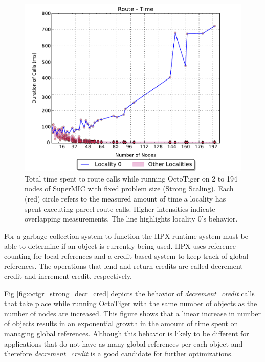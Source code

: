 \begin{figure}[t]
    \centering
    \includegraphics[width=.54\textwidth,height=\textheight,keepaspectratio]{graphs/octotiger_route_time}
    \caption{Total time spent to route calls while running OctoTiger on 2 to 194 nodes of SuperMIC with fixed problem size (Strong Scaling). Each (red) circle refers to the measured amount of time a locality has spent executing parcel route calls. Higher intensities indicate overlapping measurements. The line highlights locality 0's behavior.}
    \label{fig:octgr_strong_route_time}
\end{figure}

For a garbage collection system to function the HPX runtime system must be able
to determine if an object is currently being used. HPX uses reference counting
for local references and a credit-based system to keep track of global
references. The operations that lend and return credits are called decrement
credit and increment credit, respectively.

Fig \ref{fig:octgr_strong_decr_cred} depicts the behavior of \textit{decrement\_credit}
calls that take place while running OctoTiger with the same number of objects as
the number of nodes are increased. This figure shows that a
linear increase in number of objects results in an exponential growth
in the amount of time spent on managing global references. Although this
behavior is likely to be different for applications that do not have as many
global references per each object and therefore \textit{decrement\_credit} is a good
candidate for further optimizations.

